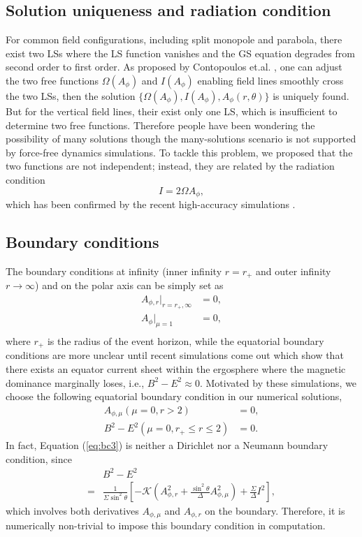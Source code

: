\documentclass[aps,prd,reprint,nofootinbib, superscriptaddress]{revtex4-1}
\def\sst{\sin^2\theta}
\def\Ap{A_\phi}
\def\Ar{A_{\phi,r}}
\def\Am{A_{\phi,\mu}}
\def\be{\begin{equation}}
\def\ee{\end{equation}}
\begin{document}
\subsection{Solution uniqueness and radiation condition}
For common field configurations, including split monopole and parabola, there exist two LSs where
the LS function vanishes and the GS equation degrades from second order to first order. As proposed
by Contopoulos et.al. \cite{Contopoulos2013}, one can adjust the two free functions $\Omega(\Ap)$
and $I(\Ap)$ enabling field lines smoothly cross the two LSs, then the solution
$\{\Omega(\Ap), I(\Ap), \Ap(r,\theta)\}$  is uniquely found. But for the vertical field lines, their
exist only one LS, which is insufficient to determine two free functions. Therefore people have been
wondering the possibility of many solutions though the many-solutions scenario is not supported by force-free
dynamics simulations. To tackle this problem, we proposed that the two functions are not independent;
instead, they are related by the radiation condition \cite{Pan2016a, Pan2017}
\be I = 2\Omega A_\phi, \label{eq:rad}\ee
which has been confirmed by the recent high-accuracy simulations \cite{East2018}.

\subsection{Boundary conditions}

The boundary conditions at infinity (inner infinity $r=r_+$ and outer infinity $r\rightarrow\infty$)
and on the polar axis can be simply set as
\be
\begin{aligned}
\Ar|_{r=r_+, \infty} &= 0, \\
A_\phi|_{\mu = 1} &= 0,\\
\end{aligned}
\ee
where $r_+$ is the radius of the event horizon,
while the equatorial boundary conditions are more unclear until recent simulations \cite{East2018}
come out which show that there exists an equator current sheet within the ergosphere where the
magnetic dominance marginally loses, i.e., $B^2-E^2\approx 0$. Motivated by these simulations,
we choose the following equatorial boundary condition in our numerical solutions,
\begin{subequations}
\begin{align}
    \Am(\mu = 0, r > 2) &= 0, \label{eq:bc2}\\
    B^2-E^2 (\mu = 0, r_+ \leq r \leq 2) &=0.\label{eq:bc3}
\end{align}
\end{subequations}
In fact, Equation (\ref{eq:bc3})
is neither a Dirichlet nor a Neumann boundary condition, since
\be
\begin{aligned}
&B^2-E^2 \\
= & \frac{1}{\Sigma \sst} \left[ -\mathcal{K} \left(\Ar^2 +\frac{\sst}{\Delta}\Am^2 \right)+\frac{\Sigma}{\Delta}I^2\right],
\end{aligned}
\ee
which involves both derivatives $\Am$ and $\Ar$ on the boundary.
Therefore, it is numerically non-trivial to impose this boundary condition in computation.
\end{document}
